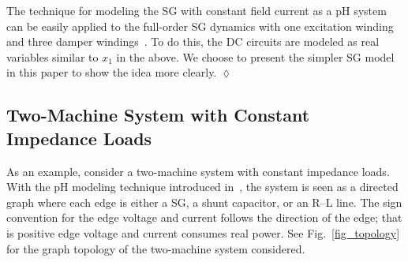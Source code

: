 \begin{comment}
The equivalence classes at time $t$ are defined in the full state space $\vect x$, i.e., from the system
\begin{align*}
    \begin{bmatrix}[1.2]
        \dot{\vect x}_1(\tau) \\
        \dot\theta(\tau)
    \end{bmatrix} &= \begin{bmatrix}
        \mathcal W \left[ (\matr J(\vect x(\tau)) - \matr R) \nabla H(t, \vect x_1(\tau)) + \matr G \vect u(\tau)\right] \\
        \omega(\tau)
    \end{bmatrix} \\
    \vect y(\tau) &= \matr G^\herm \nabla H(t, \vect x_1(\tau)),
\end{align*}
where $\vect u(\tau)$ is supplied from the other open subsystems.
It can be checked that, ignoring the input, Proposition~\ref{prop_convergence} holds by treating $\theta$ similar to $\vect x_1$ except that $\theta$ does not contribute to the distance. %
\end{comment}

\begin{remark}
The technique for modeling the SG with constant field current as a pH system can be easily applied to the full-order SG dynamics with one excitation winding and three damper windings~\cite{vittal2019power}. To do this, the DC circuits are modeled as real variables similar to $x_1$ in the above. We choose to present the simpler SG model in this paper to show the idea more clearly. \hfill $\lozenge$
\end{remark}


\subsection{Two-Machine System with Constant Impedance Loads}
As an example, consider a two-machine system with constant impedance loads. With the pH modeling technique introduced in~\cite{fiaz2013port}, the system is seen as a directed graph where each edge is either a SG, a shunt capacitor, or an R--L line. The sign convention for the edge voltage and current follows the direction of the edge; that is positive edge voltage and current consumes real power. See Fig.~\ref{fig_topology} for the graph topology of the two-machine system considered.

